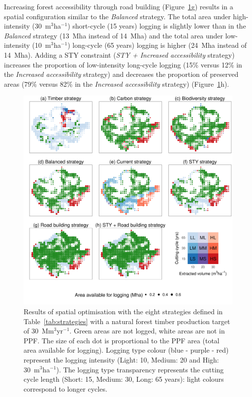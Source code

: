 \documentclass[12pt]{article}
\begin{document}
Increasing forest accessibility through road building (Figure~\ref{fig:mapsStrateg}g) results in a spatial configuration similar to the \textit{Balanced} strategy. The total area under high-intensity (30~m$^3$ha$^{-1}$) short-cycle (15 years) logging is slightly lower than in the \textit{Balanced} strategy (13~Mha instead of 14~Mha) and the total area under low-intensity (10~m$^3$ha$^{-1}$) long-cycle (65 years) logging is higher (24~Mha instead of 14~Mha). Adding a STY constraint (\textit{STY + Increased accessibility} strategy) increases the proportion of low-intensity long-cycle logging (15\% versus 12\% in the \textit{Increased accessibility} strategy) and decreases the proportion of preserved areas (79\% versus 82\% in the \textit{Increased accessibility} strategy)  (Figure~\ref{fig:mapsStrateg}h). 


\begin{figure}
    \centering
    \includegraphics[width=0.8\linewidth]{graphs/mapsScenarios.pdf}
    \caption{Results of spatial optimisation with the eight strategies defined in Table~\ref{tab:strategies} with a natural forest timber production target of 30~Mm$^3$yr$^{-1}$. Green areas are not logged, white areas are not in PPF. The size of each dot is proportional to the PPF area (total area available for logging). Logging type colour (blue - purple - red) represent the logging intensity (Light: 10, Medium: 20 and High: 30~m$^3$ha$^{-1}$). The logging type transparency represents the cutting cycle length (Short: 15, Medium: 30, Long: 65 years): light colours correspond to longer cycles.}
    \label{fig:mapsStrateg}
\end{figure}
\end{document}
